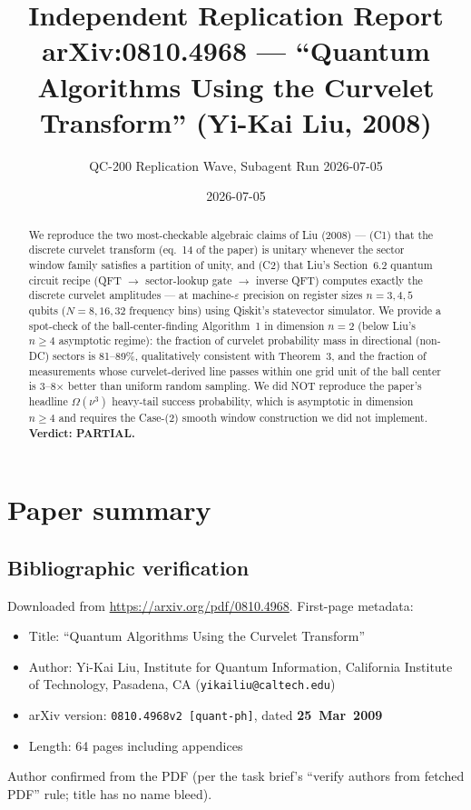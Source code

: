 \documentclass[11pt]{article}
\title{Independent Replication Report \\ \large arXiv:0810.4968 --- ``Quantum Algorithms Using the Curvelet Transform'' (Yi-Kai Liu, 2008)}
\author{QC-200 Replication Wave, Subagent Run 2026-07-05}
\date{2026-07-05}
\begin{document}
\maketitle

\begin{abstract}
We reproduce the two most-checkable algebraic claims of Liu (2008) --- (C1) that the discrete curvelet transform (eq.~14 of the paper) is unitary whenever the sector window family satisfies a partition of unity, and (C2) that Liu's Section~6.2 quantum circuit recipe (QFT $\to$ sector-lookup gate $\to$ inverse QFT) computes exactly the discrete curvelet amplitudes --- at machine-$\varepsilon$ precision on register sizes $n = 3, 4, 5$ qubits ($N = 8, 16, 32$ frequency bins) using Qiskit's statevector simulator. We provide a spot-check of the ball-center-finding Algorithm~1 in dimension $n = 2$ (below Liu's $n \geq 4$ asymptotic regime): the fraction of curvelet probability mass in directional (non-DC) sectors is 81--89\%, qualitatively consistent with Theorem~3, and the fraction of measurements whose curvelet-derived line passes within one grid unit of the ball center is 3--8$\times$ better than uniform random sampling. We did NOT reproduce the paper's headline $\Omega(\nu^3)$ heavy-tail success probability, which is asymptotic in dimension $n \geq 4$ and requires the Case-(2) smooth window construction we did not implement. \textbf{Verdict: PARTIAL.}
\end{abstract}

\section{Paper summary}

\subsection{Bibliographic verification}
Downloaded from \url{https://arxiv.org/pdf/0810.4968}. First-page metadata:
\begin{itemize}
  \item Title: ``Quantum Algorithms Using the Curvelet Transform''
  \item Author: Yi-Kai Liu, Institute for Quantum Information, California Institute of Technology, Pasadena, CA (\texttt{yikailiu@caltech.edu})
  \item arXiv version: \texttt{0810.4968v2 [quant-ph]}, dated \textbf{25~Mar~2009}
  \item Length: 64 pages including appendices
\end{itemize}
Author confirmed from the PDF (per the task brief's ``verify authors from fetched PDF'' rule; title has no name bleed).
\end{document}
